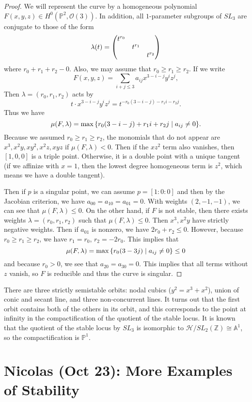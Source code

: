 \documentclass[leqno, openany]{memoir}
\theoremstyle{definition}
\theoremstyle{remark}
\theoremstyle{plain}
\theoremstyle{definition}
\theoremstyle{remark}
\newcommand{\A}{\mathbb{A}}
\newcommand{\Z}{\mathbb{Z}}
\renewcommand{\P}{\mathbb{P}}
\newcommand{\mc}[1]{\mathcal{#1}}
\begin{document}
\begin{proof}
    We will represent the curve by a homogeneous polynomial $F(x,y,z) \in H^0(\P^2, \mc{O}(3))$. In addition, all $1$-parameter subgroups of $SL_3$ are conjugate to those of the form
    \[ \lambda(t) = \mqty(\dmat{t^{r_0}, t^{r_1}, t^{r_2}}) \]
    where $r_0 + r_1 + r_2 - 0$. Also, we may assume that $r_0 \geq r_1 \geq r_2$. If we write 
    \[ F(x,y,z) = \sum_{i+j \leq 3} a_{ij} x^{3-i-j} y^i z^j, \]
    Then $\lambda = (r_0, r_1, r_2)$ acts by
    \[ t \cdot x^{3-i-j} y^i z^j = t^{-r_0(3-i-j) - r_1 i - r_2 j}. \]
    Thus we have
    \[ \mu(F, \lambda) = \max \qty{ r_0(3-i-j) + r_1 i + r_2 j \mid a_{ij} \neq 0 }. \]
    Because we assumed $r_0 \geq r_1 \geq r_2$, the monomials that do not appear are $x^3, x^2 y, xy^2, x^2 z, xyz$ if $\mu(F, \lambda) < 0$. Then if the $xz^2$ term also vanishes, then $[1,0,0]$ is a triple point. Otherwise, it is a double point with a unique tangent (if we affinize with $x = 1$, then the lowest degree homogeneous term is $z^2$, which means we have a double tangent).

    Then if $p$ is a singular point, we can assume $p = [1:0:0]$ and then by the Jacobian criterion, we have $a_{00} = a_{10} = a_{01} = 0$. With weights $(2,-1,-1)$, we can see that $\mu(F, \lambda) \leq 0$. On the other hand, if $F$ is not stable, then there exists weights $\lambda = (r_0, r_1, r_2)$ such that $\mu(F, \lambda) \leq 0$. Then $x^3, x^2y$ have strictly negative weights. Then if $a_{01}$ is nonzero, we have $2r_0 + r_2 \leq 0$. However, because $r_0 \geq r_1 \geq r_2$, we have $r_1 = r_0$, $r_2 = -2r_0$. This implies that
    \[ \mu(F, \lambda) = \max \qty{r_0(3-3j) \mid a_{ij} \neq 0} \leq 0 \]
    and because $r_0 > 0$, we see that $a_{20} = a_{30} = 0$. This implies that all terms without $z$ vanish, so $F$ is reducible and thus the curve is singular.
\end{proof}

There are three strictly semistable orbits: nodal cubics ($y^2 = x^3 + x^2$), union of conic and secant line, and three non-concurrent lines. It turns out that the first orbit contains both of the others in its orbit, and this corresponds to the point at infinity in the compactification of the quotient of the stable locus. It is known that the quotient of the stable locus by $SL_3$ is isomorphic to $\mc{H} / SL_2(\Z) \cong \A^1$, so the compactification is $\P^1$.

\chapter{Nicolas (Oct 23): More Examples of Stability}%
\label{cha:nicolas_oct_23_more_examples_of_stability}
\end{document}
